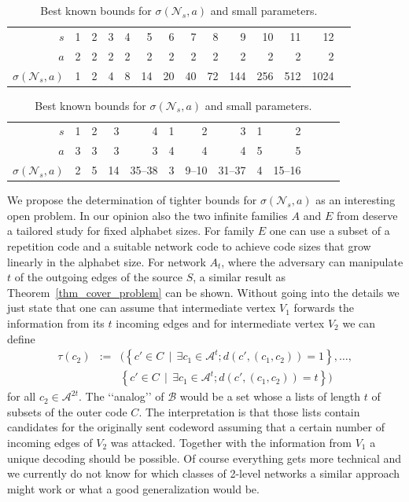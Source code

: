 \documentclass[11pt]{article}
\newcommand{\cA}{\mathcal{A}}
\newcommand{\cN}{\mathcal{N}}
\begin{document}
\begin{table}[htp]
  \begin{center}
    \begin{tabular}{rrrrrrrrrrrrrr}
      \hline
      $s$               & 1 & 2 & 3 & 4 &  5 &  6 &  7 &  8 &   9 &  10 &  11 &   12 \\ 
      $a$               & 2 & 2 & 2 & 2 &  2 &  2 &  2 &  2 &   2 &   2 &   2 &    2 \\ 
      $\sigma(\cN_s,a)$ & 1 & 2 & 4 & 8 & 14 & 20 & 40 & 72 & 144 & 256 & 512 & 1024 \\      
      \hline
    \end{tabular}
    \smallskip
    \begin{tabular}{rrrrrrrrrrrrr}
      \hline
      $s$               & 1 & 2 &  3 &      4 & 1 &     2 &      3 & 1 &      2 \\ 
      $a$               & 3 & 3 &  3 &      3 & 4 &     4 &      4 & 5 &      5 \\ 
      $\sigma(\cN_s,a)$ & 2 & 5 & 14 & 35--38 & 3 & 9--10 & 31--37 & 4 & 15--16 \\      
      \hline
    \end{tabular}
    \caption{Best known bounds for $\sigma(\cN_s,a)$ and small parameters.}
    \label{table_summary}
  \end{center}   
\end{table}

We propose the determination of tighter bounds for $\sigma(\cN_s,a)$ as an interesting open problem. 
In our opinion also the two infinite families $A$ and $E$ from \cite{beemer2022network_arxiv} deserve a 
tailored study for fixed alphabet sizes. For family $E$ one can use a subset of a repetition code and 
a suitable network code to achieve code sizes that grow linearly in the alphabet size. 
For network $A_t$, where the adversary can manipulate $t$ of the outgoing 
edges of the source $S$, a similar result as Theorem~\ref{thm_cover_problem} can be shown. Without going into the 
details we just state that one can assume that intermediate vertex $V_1$ forwards the information from its $t$ incoming 
edges and for intermediate vertex $V_2$ we can define 
\begin{eqnarray*}
  \tau(c_2)&:=&\Big(\left\{c'\in C\,\mid\, \exists c_1\in \cA^t; d(c',(c_1,c_2))=1\right\},\dots,\\ 
  && \left\{c'\in C\,\mid\, \exists c_1\in \cA^t; d(c',(c_1,c_2))=t\right\}\Big)
\end{eqnarray*} 
for all $c_2\in\cA^{2t}$. The {\lq\lq}analog{\rq\rq} of $\mathcal{B}$ would be a set whose a lists of length $t$ of 
subsets of the outer code $C$. The interpretation is that those lists contain candidates for the originally sent codeword 
assuming that a certain number of incoming edges of $V_2$ was attacked. Together with the information from $V_1$ 
a unique decoding should be possible. Of course everything gets more technical and we currently do not know for which classes 
of 2-level networks a similar approach might work or what a good generalization would be.  
\end{document}
